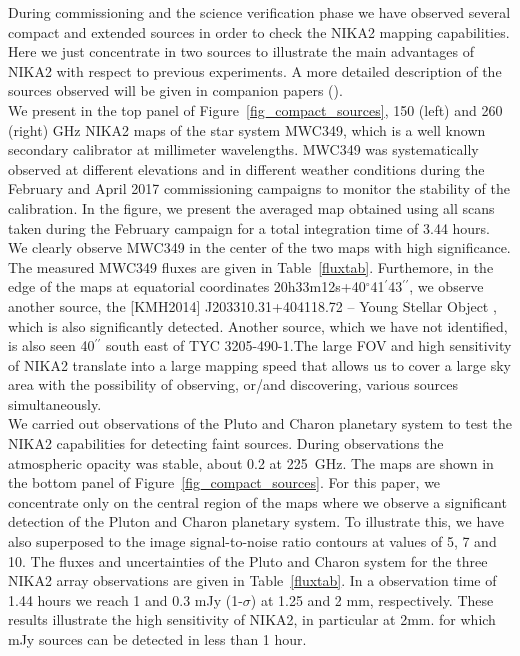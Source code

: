 \documentclass[]{aa} %
\begin{document}

During commissioning and the science verification phase we have observed several compact and extended sources 
in order to check the NIKA2 mapping capabilities. Here we just concentrate in two sources to illustrate the main advantages of NIKA2 with respect to previous experiments. A more detailed description of the sources observed will be given in companion papers (\cite{commissioning,pipeline}). \\

We present in the top panel of Figure~\ref{fig_compact_sources}, 150 (left) and 260 (right) GHz NIKA2 maps of the star system MWC349, which is a well known secondary calibrator at millimeter wavelengths. MWC349 was systematically observed at different elevations and in different weather conditions during the February and April 2017 commissioning campaigns to monitor the stability of the calibration. In the figure, we present the averaged map obtained using all scans taken during the February
campaign for a total integration time of 3.44 hours. We clearly observe MWC349 in the center of the two maps with high significance. The measured MWC349 fluxes are given in Table~\ref{fluxtab}. Furthemore, in the edge of the maps at equatorial coordinates 20h33m12s+40$^{\circ}$41$^{\prime}$43$^{\prime \prime}$, we observe another source, the [KMH2014] J203310.31+404118.72 -- Young Stellar Object , which is also significantly detected. Another source, which we have not identified, is also seen 40$^{\prime \prime}$ south east of TYC 3205-490-1.The large FOV and high sensitivity of NIKA2 translate into a large mapping speed that allows us to cover a large sky area with the possibility of observing, or/and discovering, various sources simultaneously. \\

We carried out observations of the Pluto and Charon planetary system to test the NIKA2 capabilities for detecting faint sources. 
During observations the atmospheric opacity was stable, about 0.2 at 225~GHz.
The maps are shown in the bottom panel of Figure~\ref{fig_compact_sources}. For this paper, we concentrate only on the central region of the maps where we observe a significant detection of the Pluton and Charon planetary system. To illustrate this, we have also superposed to the image signal-to-noise ratio contours at values of 5, 7 and 10. The fluxes and uncertainties of the Pluto and Charon system for the three NIKA2 array observations are given in Table~\ref{fluxtab}. In a observation time of 1.44 hours we reach 1 and 0.3 mJy (1-$\sigma$) at 1.25 and 2 mm, respectively.
These results illustrate the high sensitivity of NIKA2, in particular at 2mm. for which mJy sources can be detected in less than 1 hour.
\end{document}
